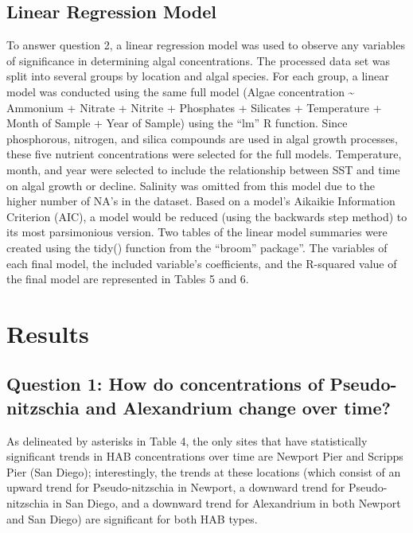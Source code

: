 \documentclass[
  12pt,
]{article}
\begin{document}
\hypertarget{linear-regression-model}{%
\subsection{Linear Regression Model}\label{linear-regression-model}}

To answer question 2, a linear regression model was used to observe any
variables of significance in determining algal concentrations. The
processed data set was split into several groups by location and algal
species. For each group, a linear model was conducted using the same
full model (Algae concentration \textasciitilde{} Ammonium + Nitrate +
Nitrite + Phosphates + Silicates + Temperature + Month of Sample + Year
of Sample) using the ``lm'' R function. Since phosphorous, nitrogen, and
silica compounds are used in algal growth processes, these five nutrient
concentrations were selected for the full models. Temperature, month,
and year were selected to include the relationship between SST and time
on algal growth or decline. Salinity was omitted from this model due to
the higher number of NA's in the dataset. Based on a model's Aikaikie
Information Criterion (AIC), a model would be reduced (using the
backwards step method) to its most parsimonious version. Two tables of
the linear model summaries were created using the tidy() function from
the ``broom'' package''. The variables of each final model, the included
variable's coefficients, and the R-squared value of the final model are
represented in Tables 5 and 6.

\newpage

\hypertarget{results}{%
\section{Results}\label{results}}

\hypertarget{question-1-how-do-concentrations-of-pseudo-nitzschia-and-alexandrium-change-over-time}{%
\subsection{Question 1: How do concentrations of Pseudo-nitzschia and
Alexandrium change over
time?}\label{question-1-how-do-concentrations-of-pseudo-nitzschia-and-alexandrium-change-over-time}}

As delineated by asterisks in Table 4, the only sites that have
statistically significant trends in HAB concentrations over time are
Newport Pier and Scripps Pier (San Diego); interestingly, the trends at
these locations (which consist of an upward trend for Pseudo-nitzschia
in Newport, a downward trend for Pseudo-nitzschia in San Diego, and a
downward trend for Alexandrium in both Newport and San Diego) are
significant for both HAB types.
\end{document}
